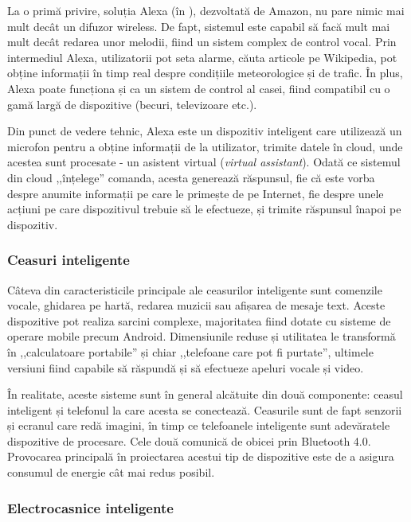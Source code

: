 La o primă privire, soluția Alexa (în ), dezvoltată de Amazon, nu pare nimic mai mult
decât un difuzor wireless. De fapt, sistemul este capabil să facă mult mai mult
decât redarea unor melodii, fiind un sistem complex de control vocal. Prin
intermediul Alexa, utilizatorii pot seta alarme, căuta articole pe
Wikipedia, pot obține informații în timp real despre condițiile
meteorologice și de trafic. În plus, Alexa poate funcționa și ca un sistem de
control al casei, fiind compatibil cu o gamă largă de dispozitive (becuri,
televizoare etc.).

Din punct de vedere tehnic, Alexa este un dispozitiv inteligent care utilizează
un microfon pentru a obține informații de la utilizator, trimite datele în
cloud, unde acestea sunt procesate - un asistent virtual (\textit{virtual assistant}). Odată ce sistemul din cloud ,,înțelege''
comanda, acesta generează răspunsul, fie că este vorba despre anumite informații
pe care le primește de pe Internet, fie despre unele acțiuni pe care
dispozitivul trebuie să le efectueze, și trimite răspunsul înapoi pe dispozitiv.

\subsubsection{Ceasuri inteligente}
\label{sec:embed:iot:impl:smartwatch}

Câteva din caracteristicile principale ale ceasurilor inteligente sunt comenzile
vocale, ghidarea pe hartă, redarea muzicii sau afișarea de mesaje text. Aceste
dispozitive pot realiza sarcini complexe, majoritatea fiind
dotate cu sisteme de operare mobile precum Android. Dimensiunile reduse și
utilitatea le transformă în ,,calculatoare portabile'' și chiar ,,telefoane care
pot fi purtate'', ultimele versiuni fiind capabile să răspundă și să efectueze
apeluri vocale și video.

În realitate, aceste sisteme sunt în general alcătuite din două componente:
ceasul inteligent și telefonul la care acesta se conectează. Ceasurile sunt de
fapt senzorii și ecranul care redă imagini, în timp ce telefoanele inteligente
sunt adevăratele dispozitive de procesare. Cele două comunică de obicei prin
Bluetooth 4.0. Provocarea principală în proiectarea acestui tip de dispozitive
este de a asigura consumul de energie cât mai redus posibil.

\subsubsection{Electrocasnice inteligente}
\label{sec:embed:iot:impl:home}

